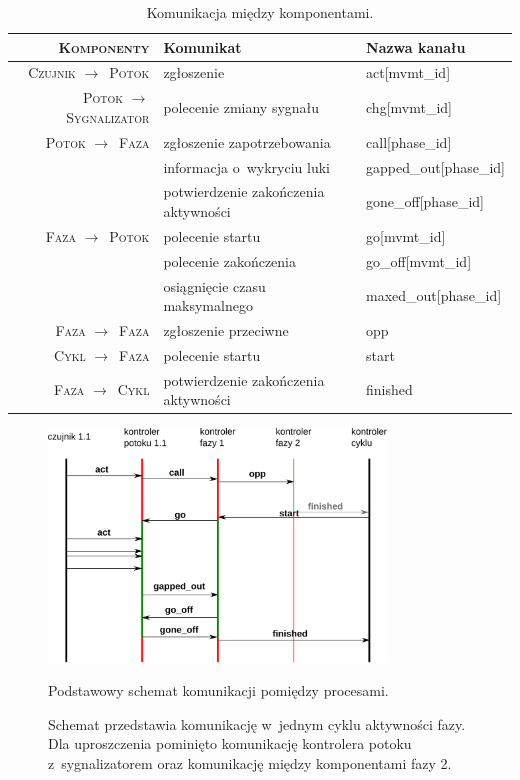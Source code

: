 \documentclass{pracamgr}
\newcommand{\rarr}{$\rightarrow$}
\theoremstyle{plain}
\begin{document}
\renewcommand{\arraystretch}{1.3}
\begin{table}
  \centering
  \begin{tabular}{>{\scshape}r|p{}|>{\ttfamily}p{}}
    \firsthline\firsthline
    \textbf{Komponenty} & \textbf{Komunikat} & \textnormal{\bfseries Nazwa kanału} \\ \hline
    Czujnik \rarr\ Potok & zgłoszenie & act[mvmt\_id] \\ \hline
    Potok \rarr\ Sygnalizator & polecenie zmiany sygnału & chg[mvmt\_id]
    \\ \hline
    Potok \rarr\ Faza & zgłoszenie zapotrzebowania & call[phase\_id] \\
                      & informacja o~wykryciu luki & gapped\_out[phase\_id] \\
                      & potwierdzenie zakończenia aktywności & gone\_off[phase\_id]
    \\ \hline
    Faza \rarr\ Potok & polecenie startu & go[mvmt\_id] \\
                      & polecenie zakończenia & go\_off[mvmt\_id] \\
                      & osiągnięcie czasu maksymalnego & maxed\_out[phase\_id]
    \\ \hline
    Faza \rarr\ Faza & zgłoszenie przeciwne & opp
    \\ \hline
    Cykl \rarr\ Faza & polecenie startu & start \\ \hline
    Faza \rarr\ Cykl & potwierdzenie zakończenia aktywności & finished \\
    \hline\hline
  \end{tabular}
  \caption{Komunikacja między komponentami.}
  \label{tab:models:channels}
\end{table}

\begin{figure}
  \centering
  \includegraphics[width=0.8\textwidth]{img/models-msc}
  \caption{Podstawowy schemat komunikacji pomiędzy procesami.}
  \caption*{Schemat przedstawia komunikację w~jednym cyklu aktywności
    fazy. Dla uproszczenia pominięto komunikację kontrolera potoku
    z~sygnalizatorem oraz komunikację między komponentami fazy 2.}
  \label{img:models:msc}
\end{figure}
\end{document}
